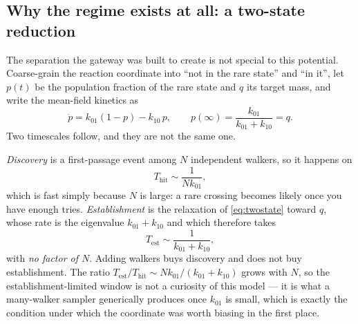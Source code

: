 \subsection{Why the regime exists at all: a two-state reduction}
\label{sec:gw_twostate}
The separation the gateway was built to create is not special to this potential. Coarse-grain
the reaction coordinate into ``not in the rare state'' and ``in it'', let $p(t)$ be the
population fraction of the rare state and $q$ its target mass, and write the mean-field
kinetics as
\begin{equation}
  \dot p = k_{01}(1-p) - k_{10}\,p ,
  \qquad
  p(\infty) = \frac{k_{01}}{k_{01}+k_{10}} = q .
  \label{eq:twostate}
\end{equation}
Two timescales follow, and they are not the same one.

\emph{Discovery} is a first-passage event among $N$ independent walkers, so it happens on
\begin{equation}
  T_{\mathrm{hit}} \sim \frac{1}{N k_{01}} ,
  \label{eq:thit}
\end{equation}
which is fast simply because $N$ is large: a rare crossing becomes likely once you have
enough tries. \emph{Establishment} is the relaxation of \cref{eq:twostate} toward $q$, whose
rate is the eigenvalue $k_{01}+k_{10}$ and which therefore takes
\begin{equation}
  T_{\mathrm{est}} \sim \frac{1}{k_{01}+k_{10}} ,
  \label{eq:test}
\end{equation}
with \emph{no factor of $N$}. Adding walkers buys discovery and does not buy establishment.
The ratio $T_{\mathrm{est}}/T_{\mathrm{hit}} \sim N k_{01}/(k_{01}+k_{10})$ grows with $N$, so
the establishment-limited window is not a curiosity of this model --- it is what a
many-walker sampler generically produces once $k_{01}$ is small, which is exactly the
condition under which the coordinate was worth biasing in the first place.

